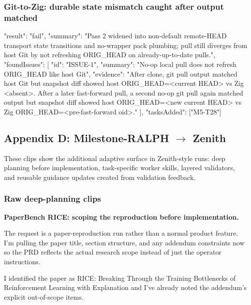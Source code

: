 \documentclass[11pt,a4paper]{article}
\begin{document}
\subsubsection{Git-to-Zig: durable state mismatch caught after output matched}

\begin{cbox}
{
  "result": "fail",
  "summary": "Pass 2 widened into non-default remote-HEAD transport state transitions and no-wrapper pack plumbing; pull still diverges from host Git by not refreshing ORIG_HEAD on already-up-to-date pulls.",
  "foundIssues": [
    { "id": "ISSUE-1",
      "summary": "No-op local pull does not refresh ORIG_HEAD like host Git",
      "evidence": "After clone, git pull output matched host Git but snapshot diff showed host ORIG_HEAD=<current HEAD> vs Zig <absent>. After a later fast-forward pull, a second no-op git pull again matched output but snapshot diff showed host ORIG_HEAD=<new current HEAD> vs Zig ORIG_HEAD=<pre-fast-forward oid>." }
  ],
  "tasksAdded": ["M5-T28"]
}
\end{cbox}

\subsection{Appendix D: Milestone-RALPH $\rightarrow$ Zenith}

These clips show the additional adaptive surface in Zenith-style runs: deep planning before implementation, task-specific worker skills, layered validators, and reusable guidance updates created from validation feedback.

\subsubsection{Raw deep-planning clips}

\textbf{PaperBench RICE: scoping the reproduction before implementation.}

\begin{cbox}
The request is a paper-reproduction run rather than a normal product feature.
I'm pulling the paper title, section structure, and any addendum constraints
now so the PRD reflects the actual research scope instead of just the
operator instructions.
\end{cbox}

\begin{cbox}
I identified the paper as RICE: Breaking Through the Training Bottlenecks
of Reinforcement Learning with Explanation and I've already noted the
addendum's explicit out-of-scope items.
\end{cbox}
\end{document}
